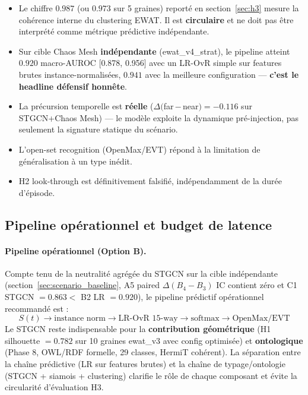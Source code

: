 \begin{itemize}
  \item Le chiffre $0.987$ (ou $0.973$ sur 5 graines) reporté en section~\ref{sec:h3}
    mesure la cohérence interne du clustering EWAT. Il est \textbf{circulaire} et ne doit pas
    être interprété comme métrique prédictive indépendante.
  \item Sur cible Chaos Mesh \textbf{indépendante} (ewat\_v4\_strat), le pipeline atteint
    $\mathbf{0.920}$ macro-AUROC [0.878, 0.956] avec un LR-OvR simple sur features brutes
    instance-normalisées, $0.941$ avec la meilleure configuration --- \textbf{c'est le headline
    défensif honnête}.
  \item La précursion temporelle est \textbf{réelle} ($\Delta($far\,$-$\,near$) = -0.116$ sur
    STGCN+Chaos Mesh) --- le modèle exploite la dynamique pré-injection, pas seulement la signature
    statique du scénario.
  \item L'open-set recognition (OpenMax/EVT) répond à la limitation de généralisation
    à un type inédit.
  \item H2 look-through est définitivement falsifié, indépendamment de la durée d'épisode.
\end{itemize}

\subsection{Pipeline opérationnel et budget de latence}
\label{sec:operational}

\paragraph{Pipeline opérationnel (Option B).}
Compte tenu de la neutralité agrégée du STGCN sur la cible indépendante
(section~\ref{sec:scenario_baseline}, A5 paired $\Delta(B_4-B_3)$ IC contient zéro
et C1 STGCN $= 0.863 <$ B2 LR $= 0.920$), le pipeline prédictif opérationnel
recommandé est :
\[
S(t) \rightarrow \text{instance norm} \rightarrow \text{LR-OvR 15-way} \rightarrow \text{softmax} \rightarrow \text{OpenMax/EVT}
\]
Le STGCN reste indispensable pour la \textbf{contribution géométrique} (H1
silhouette $= 0.782$ sur 10 graines ewat\_v3 avec config optimisée) et
\textbf{ontologique} (Phase 8, OWL/RDF formelle, 29 classes, HermiT cohérent).
La séparation entre la chaîne prédictive (LR sur features brutes) et la chaîne
de typage/ontologie (STGCN + siamois + clustering) clarifie le rôle de chaque
composant et évite la circularité d'évaluation H3.


